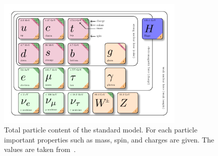 \begin{figure}[tbp]
 \centering
 \includegraphics[width=0.8\textwidth]{figures/general/SM}
 \caption{Total particle content of the standard model. For each particle important properties such as mass, spin, and charges are given. The values are taken from~\cite{PDG}.}
 \label{fig:SM}
 
\end{figure}


